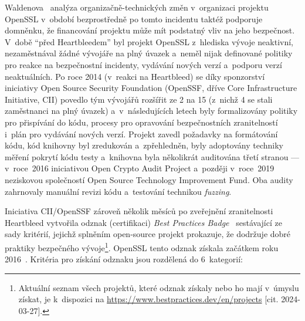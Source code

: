 Waldenova~\cite{impact-openssl} analýza organizačně-technických změn v~organizaci projektu OpenSSL v~období bezprostředně po tomto incidentu taktéž podporuje domněnku, že financování projektu může mít podstatný vliv na jeho bezpečnost. V~době ``před Heartbleedem'' byl projekt OpenSSL z~hlediska vývoje neaktivní, nezaměstnával žádné vývojáře na plný úvazek a~neměl nijak definované politiky pro reakce na bezpečnostní incidenty, vydávání nových verzí a~podporu verzí neaktuálních. Po roce 2014 (v~reakci na Heartbleed) se díky sponzorství iniciativy Open Source Security Foundation (OpenSSF, dříve Core Infrastructure Initiative, CII) povedlo tým vývojářů rozšířit ze 2 na 15 (z~nichž 4 se stali zaměstnanci na plný úvazek) a~v~následujících letech byly formalizovány politiky pro přispívání do kódu, procesy pro opravování bezpečnostních zranitelností i~plán pro vydávání nových verzí. Projekt zavedl požadavky na formátování kódu, kód knihovny byl zredukován a~zpřehledněn, byly adoptovány techniky měření pokrytí kódu testy a~knihovna byla několikrát auditována třetí stranou --- v~roce~2016 iniciativou Open Crypto Audit Project a~později v~roce~2019 neziskovou společností Open Source Technology Improvement Fund. Oba audity zahrnovaly manuální revizi kódu a~testování technikou \emph{fuzzing}.~\cite{impact-openssl}

Iniciativa CII/OpenSSF zároveň několik měsíců po zveřejnění zranitelnosti Heartbleed vytvořila odznak (certifikaci) \emph{Best Practices Badge}~\cite{ciibadge} sestávající ze sady kritérií, jejichž splněním open-source projekt prokazuje, že dodržuje dobré praktiky bezpečného vývoje\footnote{Aktuální seznam všech projektů, které odznak získaly nebo ho mají v~úmyslu získat, je k~dispozici na \url{https://www.bestpractices.dev/en/projects} [cit. 2024-03-27].}. OpenSSL tento odznak získala začátkem roku 2016~\cite{impact-openssl}. Kritéria pro získání odznaku jsou rozdělená do 6~kategorií:

